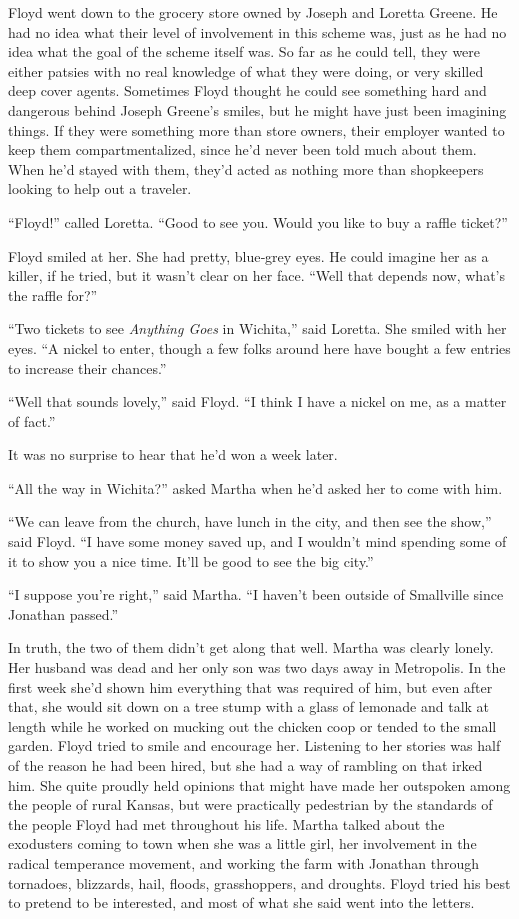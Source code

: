 \documentclass[ebook,12pt]{memoir}
\begin{document}
Floyd went down to the grocery store owned by Joseph and Loretta Greene.
He had no idea what their level of involvement in this scheme was, just
as he had no idea what the goal of the scheme itself was. So far as he
could tell, they were either patsies with no real knowledge of what they
were doing, or very skilled deep cover agents. Sometimes Floyd thought
he could see something hard and dangerous behind Joseph Greene's smiles,
but he might have just been imagining things. If they were something
more than store owners, their employer wanted to keep them
compartmentalized, since he'd never been told much about them. When he'd
stayed with them, they'd acted as nothing more than shopkeepers looking
to help out a traveler.

``Floyd!'' called Loretta. ``Good to see you. Would you like to buy a
raffle ticket?''

Floyd smiled at her. She had pretty, blue‐grey eyes. He could imagine
her as a killer, if he tried, but it wasn't clear on her face. ``Well
that depends now, what's the raffle for?''

``Two tickets to see \emph{Anything Goes} in Wichita,'' said Loretta.
She smiled with her eyes. ``A nickel to enter, though a few folks around
here have bought a few entries to increase their chances.''

``Well that sounds lovely,'' said Floyd. ``I think I have a nickel on
me, as a matter of fact.''

It was no surprise to hear that he'd won a week later.

``All the way in Wichita?'' asked Martha when he'd asked her to come
with him.

``We can leave from the church, have lunch in the city, and then see the
show,'' said Floyd. ``I have some money saved up, and I wouldn't mind
spending some of it to show you a nice time. It'll be good to see the
big city.''

``I suppose you're right,'' said Martha. ``I haven't been outside of
Smallville since Jonathan passed.''

In truth, the two of them didn't get along that well. Martha was clearly
lonely. Her husband was dead and her only son was two days away in
Metropolis. In the first week she'd shown him everything that was
required of him, but even after that, she would sit down on a tree stump
with a glass of lemonade and talk at length while he worked on mucking
out the chicken coop or tended to the small garden. Floyd tried to smile
and encourage her. Listening to her stories was half of the reason he
had been hired, but she had a way of rambling on that irked him. She
quite proudly held opinions that might have made her outspoken among the
people of rural Kansas, but were practically pedestrian by the standards
of the people Floyd had met throughout his life. Martha talked about the
exodusters coming to town when she was a little girl, her involvement in
the radical temperance movement, and working the farm with Jonathan
through tornadoes, blizzards, hail, floods, grasshoppers, and droughts.
Floyd tried his best to pretend to be interested, and most of what she
said went into the letters.
\end{document}
